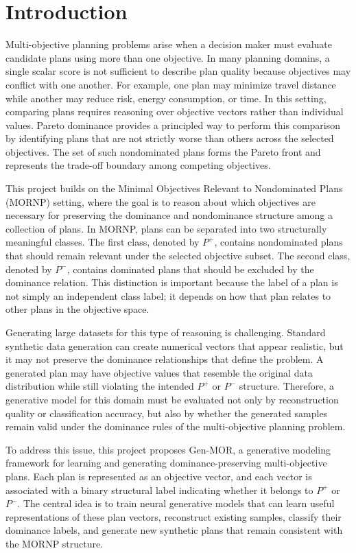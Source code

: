 \section{Introduction}

Multi-objective planning problems arise when a decision maker must evaluate candidate plans using more than one objective. In many planning domains, a single scalar score is not sufficient to describe plan quality because objectives may conflict with one another. For example, one plan may minimize travel distance while another may reduce risk, energy consumption, or time. In this setting, comparing plans requires reasoning over objective vectors rather than individual values. Pareto dominance provides a principled way to perform this comparison by identifying plans that are not strictly worse than others across the selected objectives. The set of such nondominated plans forms the Pareto front and represents the trade-off boundary among competing objectives. 

This project builds on the Minimal Objectives Relevant to Nondominated Plans (MORNP) setting, where the goal is to reason about which objectives are necessary for preserving the dominance and nondominance structure among a collection of plans. In MORNP, plans can be separated into two structurally meaningful classes. The first class, denoted by $P^{+}$, contains nondominated plans that should remain relevant under the selected objective subset. The second class, denoted by $P^{-}$, contains dominated plans that should be excluded by the dominance relation. This distinction is important because the label of a plan is not simply an independent class label; it depends on how that plan relates to other plans in the objective space.

Generating large datasets for this type of reasoning is challenging. Standard synthetic data generation can create numerical vectors that appear realistic, but it may not preserve the dominance relationships that define the problem. A generated plan may have objective values that resemble the original data distribution while still violating the intended $P^{+}$ or $P^{-}$ structure. Therefore, a generative model for this domain must be evaluated not only by reconstruction quality or classification accuracy, but also by whether the generated samples remain valid under the dominance rules of the multi-objective planning problem.

To address this issue, this project proposes Gen-MOR, a generative modeling framework for learning and generating dominance-preserving multi-objective plans. Each plan is represented as an objective vector, and each vector is associated with a binary structural label indicating whether it belongs to $P^{+}$ or $P^{-}$. The central idea is to train neural generative models that can learn useful representations of these plan vectors, reconstruct existing samples, classify their dominance labels, and generate new synthetic plans that remain consistent with the MORNP structure.

